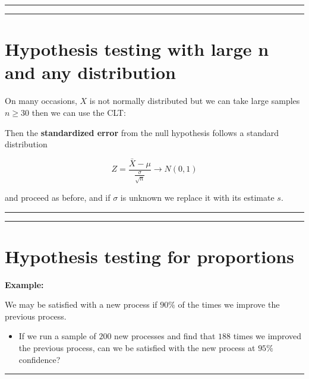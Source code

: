 \documentclass[
]{book}
\providecommand{\tightlist}{%
  \setlength{\itemsep}{0pt}\setlength{\parskip}{0pt}}
\begin{document}
\begin{center}\rule{0.5\linewidth}{0.5pt}\end{center}

\begin{center}\rule{0.5\linewidth}{0.5pt}\end{center}

\hypertarget{hypothesis-testing-with-large-n-and-any-distribution}{%
\section{Hypothesis testing with large n and any distribution}\label{hypothesis-testing-with-large-n-and-any-distribution}}

On many occasions, \(X\) is not normally distributed but we can take large samples \(n \ge 30\) then we can use the CLT:

Then the \textbf{standardized error} from the null hypothesis follows a standard distribution

\[Z=\frac{\bar{X}-\mu}{\frac{\sigma}{\sqrt{n}}}  \rightarrow N(0,1)\]

and proceed as before, and if \(\sigma\) is unknown we replace it with its estimate \(s\).

\begin{center}\rule{0.5\linewidth}{0.5pt}\end{center}

\begin{center}\rule{0.5\linewidth}{0.5pt}\end{center}

\hypertarget{hypothesis-testing-for-proportions}{%
\section{Hypothesis testing for proportions}\label{hypothesis-testing-for-proportions}}

\textbf{Example:}

We may be satisfied with a new process if \(90\%\) of the times we improve the previous process.

\begin{itemize}
\tightlist
\item
  If we run a sample of \(200\) new processes and find that \(188\) times we improved the previous process, can we be satisfied with the new process at \(95\%\) confidence?
\end{itemize}

\begin{center}\rule{0.5\linewidth}{0.5pt}\end{center}
\end{document}
